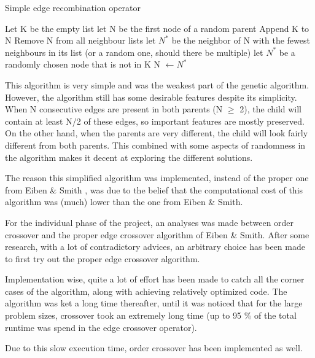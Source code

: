 \documentclass[a4paper,10pt]{article}
\begin{document}
\begin{algorithm}
\caption{Simple edge recombination operator}\label{simple_edge_crossover}
\begin{algorithmic}
\State Let K be the empty list
\State let N be the first node of a random parent
\State Append K to N
\State Remove N from all neighbour lists
\State let $N^*$ be the neighbor of N with the fewest neighbours in its list (or a random one, should there be multiple)
\Else 
\State let $N^*$ be a randomly chosen node that is not in K
\EndIf
\EndWhile
\State N $\gets N^*$
\end{algorithmic}
\end{algorithm}

This algorithm is very simple and was the weakest part of the genetic algorithm. However, the algorithm still has some desirable features despite its simplicity. When N consecutive edges are present in both parents (N $ \ge $ 2), the child will contain at least N/2 of these edges, so important features are mostly preserved. On the other hand,
when the parents are very different, the child will look fairly different from both parents. This combined with some aspects of randomness in the algorithm makes it decent at exploring the different solutions. 

The reason this simplified algorithm was implemented, instead of the proper one from Eiben \& Smith \cite{eiben_smith}, was due to the belief that the computational cost of this algorithm was (much) lower than the one from Eiben \& Smith. 


For the individual phase of the project, an analyses was made between order crossover and the proper edge crossover algorithm of Eiben \& Smith. After some research, with a lot of contradictory advices, an arbitrary choice has been made to first try out the proper edge crossover algorithm.

Implementation wise, quite a lot of effort has been made to catch all the corner cases of the algorithm, along with achieving relatively optimized code. The algorithm was ket a long time thereafter, until it was noticed that for the large problem sizes, crossover took an extremely long time (up to 95 \% of the total runtime was spend in the edge crossover operator). 

Due to this slow execution time, order crossover \cite{eiben_smith} has been implemented as well. 
\end{document}
